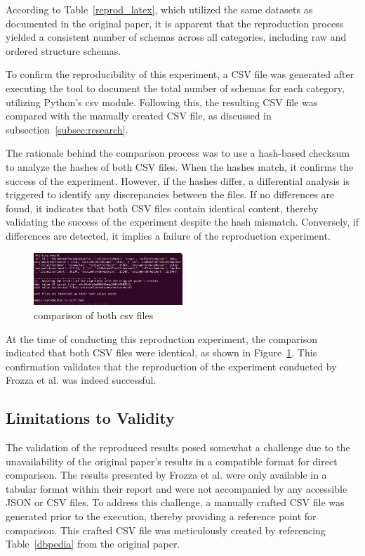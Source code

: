 \documentclass[sigconf, nonacm]{acmart}
\begin{document}
According to Table~\ref{reprod_latex}, which utilized the same datasets as documented in the original paper, it is apparent that the reproduction process yielded a consistent number of schemas across all categories, including raw and ordered structure schemas.

To confirm the reproducibility of this experiment, a CSV file was generated after executing the tool to document the total number of schemas for each category, utilizing Python's csv module. Following this, the resulting CSV file was compared with the manually created CSV file, as discussed in subsection~\ref{subsec:research}.

The rationale behind the comparison process was to use a hash-based checksum to analyze the hashes of both CSV files. When the hashes match, it confirms the success of the experiment. However, if the hashes differ, a differential analysis is triggered to identify any discrepancies between the files. If no differences are found, it indicates that both CSV files contain identical content,  thereby validating the success of the experiment despite the hash mismatch. Conversely, if differences are detected, it implies a failure of the reproduction experiment.

 \begin{figure}
     \centering
     \includegraphics[height=0.2\textwidth, width=0.5\textwidth]{img/experiment.png}
     \caption{comparison of both csv files }
     \label{fig:experiment}
 \end{figure}

At the time of conducting this reproduction experiment, the comparison indicated that both CSV files were identical, as shown in Figure~\ref{fig:experiment}. This confirmation validates that the reproduction of the experiment conducted by Frozza et al. \cite{frozza2018approach} was indeed successful.

\subsection{Limitations to Validity}
The validation of the reproduced results posed somewhat a challenge due to the unavailability of the original paper's results in a compatible format for direct comparison. The results presented by Frozza et al. \cite{frozza2018approach} were only available in a tabular format within their report and were not accompanied by any accessible JSON or CSV files. To address this challenge, a manually crafted CSV file was generated prior to the execution, thereby providing a reference point for comparison. This crafted CSV file was meticulously created by referencing Table~\ref{dbpedia} from the original paper.
\end{document}
